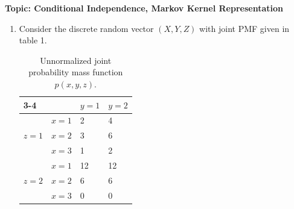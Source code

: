 

\flushleft\textbf{Topic: Conditional Independence, Markov Kernel Representation}
\begin{enumerate}[label=4.\arabic*]
    \item %
    Consider the discrete random vector $(X, Y, Z)$ with joint PMF given in table 1.

    \begin{table}[htb]
        \centering
        \begin{tabular}{llll}
            \cline{3-4}
                                                         & \multicolumn{1}{l|}{}      & \multicolumn{1}{l|}{$y=1$} & \multicolumn{1}{l|}{$y=2$} \\ \hline
            \multicolumn{1}{|c|}{\multirow{3}{*}{$z=1$}} & \multicolumn{1}{l|}{$x=1$} & \multicolumn{1}{l|}{2}     & \multicolumn{1}{l|}{4}     \\ \cline{2-4}
            \multicolumn{1}{|c|}{}                       & \multicolumn{1}{l|}{$x=2$} & \multicolumn{1}{l|}{3}     & \multicolumn{1}{l|}{6}     \\ \cline{2-4}
            \multicolumn{1}{|c|}{}                       & \multicolumn{1}{l|}{$x=3$} & \multicolumn{1}{l|}{1}     & \multicolumn{1}{l|}{2}     \\ \hline
            \multicolumn{1}{|l|}{\multirow{3}{*}{$z=2$}} & \multicolumn{1}{l|}{$x=1$} & \multicolumn{1}{l|}{12}    & \multicolumn{1}{l|}{12}    \\ \cline{2-4}
            \multicolumn{1}{|l|}{}                       & \multicolumn{1}{l|}{$x=2$} & \multicolumn{1}{l|}{6}     & \multicolumn{1}{l|}{6}     \\ \cline{2-4}
            \multicolumn{1}{|l|}{}                       & \multicolumn{1}{l|}{$x=3$} & \multicolumn{1}{l|}{0}     & \multicolumn{1}{l|}{0}     \\ \hline
        \end{tabular}
        \caption{Unnormalized joint probability mass function $p(x, y, z)$.}
    \end{table}\label{discrete-ci}


\end{enumerate}
